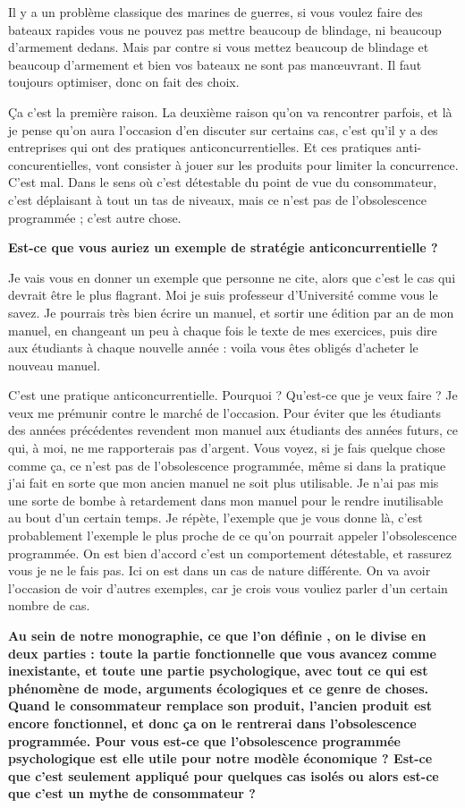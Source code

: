 \begin{small}
Il y a un problème classique des marines de guerres, si vous voulez faire des bateaux rapides vous ne pouvez pas mettre beaucoup de blindage, ni beaucoup d'armement dedans. Mais par contre si vous mettez beaucoup de blindage et beaucoup d'armement et bien vos bateaux ne sont pas manœuvrant. Il faut toujours optimiser, donc on fait des choix. 

Ça c'est la première raison. La deuxième raison qu'on va rencontrer parfois, et là je pense qu'on aura l'occasion d'en discuter sur certains cas, c'est qu'il y a  des entreprises qui ont des pratiques anticoncurrentielles. Et ces pratiques anti-concurentielles, vont consister à jouer sur les produits pour limiter la concurrence. C'est mal. Dans le sens où c'est détestable du point de vue du consommateur, c'est déplaisant à tout un tas de niveaux, mais ce n'est pas de l'obsolescence programmée ; c'est autre chose.

\smallbreak\textbf{Est-ce que vous auriez un exemple de stratégie anticoncurrentielle ?
}\smallbreak

 Je vais vous en donner un exemple que personne ne cite, alors que c'est le cas qui devrait être le plus flagrant. Moi je suis professeur d'Université comme vous le savez. Je pourrais très bien écrire un manuel, et sortir une édition par an de mon manuel, en changeant un peu à chaque fois le texte de mes exercices, puis dire aux étudiants à chaque nouvelle année  : voila vous êtes obligés d'acheter le nouveau manuel. 


C'est une pratique anticoncurrentielle. Pourquoi ? Qu'est-ce que je veux faire ?  Je veux me prémunir contre le marché de l'occasion. Pour éviter que les étudiants des années précédentes revendent mon manuel aux étudiants des années futurs, ce qui, à moi, ne me rapporterais pas d'argent. Vous voyez, si je fais quelque chose comme ça, ce n'est pas de l'obsolescence programmée, même si dans la pratique j'ai fait en sorte que mon ancien manuel ne soit plus utilisable. Je n'ai pas mis une sorte de bombe à retardement dans mon manuel pour le rendre inutilisable au bout d'un certain temps. Je répète, l'exemple que je vous donne là, c'est probablement l'exemple le plus proche de ce qu'on pourrait appeler l'obsolescence programmée. On est bien d'accord c'est un comportement détestable, et rassurez vous je ne le fais pas. Ici on est dans un cas de nature différente. On va avoir l'occasion de voir d'autres exemples, car je crois vous vouliez parler d'un certain nombre de cas.

\smallbreak\textbf{
Au sein de notre monographie, ce que l'on définie \textit{\OP}, on le divise en deux parties : toute la partie fonctionnelle que vous avancez comme inexistante, et toute une partie psychologique, avec tout ce qui est phénomène de mode, arguments écologiques et ce genre de choses. Quand le consommateur remplace son produit, l'ancien produit est encore fonctionnel, et donc ça on le rentrerai dans l'obsolescence programmée. Pour vous est-ce que l'obsolescence programmée psychologique est elle utile pour notre modèle économique ? Est-ce que c'est seulement appliqué pour quelques cas isolés ou alors est-ce que c'est un mythe de consommateur ?
}\smallbreak


\end{small}
